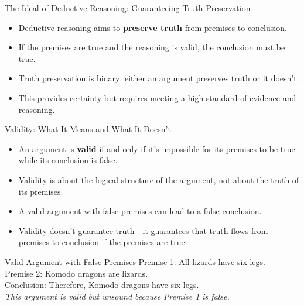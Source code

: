 \documentclass{beamer}
\begin{document}
\begin{frame}{The Ideal of Deductive Reasoning: Guaranteeing Truth Preservation}
    \begin{itemize}
        \item Deductive reasoning aims to \textbf{preserve truth} from premises to conclusion.
        \item If the premises are true and the reasoning is valid, the conclusion must be true.
        \item Truth preservation is binary: either an argument preserves truth or it doesn't.
        \item This provides certainty but requires meeting a high standard of evidence and reasoning.
    \end{itemize}
    
\end{frame}

\begin{frame}{Validity: What It Means and What It Doesn't}
    \begin{itemize}
        \item An argument is \textbf{valid} if and only if it's impossible for its premises to be true while its conclusion is false.
        \item Validity is about the logical structure of the argument, not about the truth of its premises.
        \item A valid argument with false premises can lead to a false conclusion.
        \item Validity doesn't guarantee truth—it guarantees that truth flows from premises to conclusion if the premises are true.
    \end{itemize}
    
    \begin{exampleblock}{Valid Argument with False Premises}
        Premise 1: All lizards have six legs.\\
        Premise 2: Komodo dragons are lizards.\\
        Conclusion: Therefore, Komodo dragons have six legs.\\
        
        \textit{This argument is valid but unsound because Premise 1 is false.}
    \end{exampleblock}
\end{frame}
\end{document}
